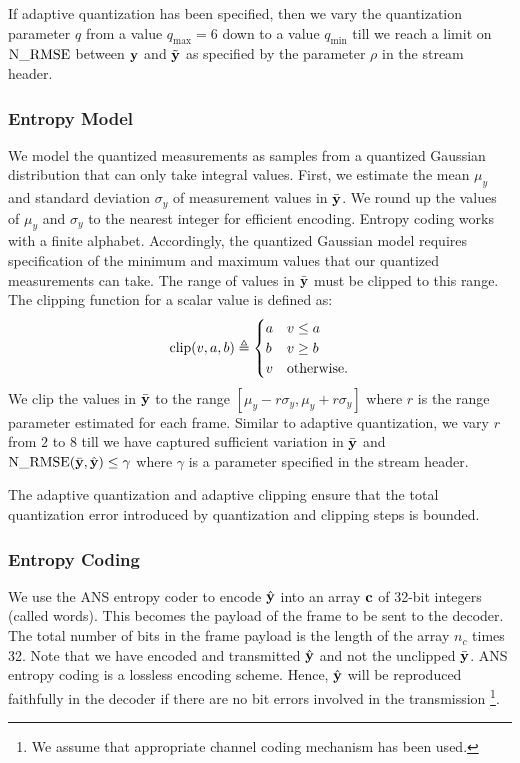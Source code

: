 If adaptive quantization has been specified, then we vary
the quantization parameter $q$ from a value $q_{\max}=6$
down to a value $q_{\min}$
till we reach a limit on $\mathrm{N\_RMSE}$ between $\mathbf{y}$ and $\tilde{\mathbf{y}}$
as specified by the parameter $\rho$ in the stream header.

\subsubsection{Entropy Model}
We model the quantized measurements as samples from
a quantized Gaussian distribution that can only take integral values.
First, we estimate the mean $\mu_y$ and standard deviation $\sigma_y$
of measurement values in $\bar{\mathbf{y}}$.
We round up the values of $\mu_y$ and $\sigma_y$ to the nearest integer
for efficient encoding.
Entropy coding works with a finite alphabet.
Accordingly, the quantized Gaussian model
requires specification of the minimum
and maximum values that our quantized
measurements can take.
The range of values in $\bar{\mathbf{y}}$ must be clipped to this range.
The clipping function for a scalar value is defined as:
\begin{equation}
\mathrm{clip} (v, a, b) \triangleq \begin{cases}
a & v \leq a \\
b & v \geq b \\
v & \text{otherwise}.
\end{cases}
\end{equation}
We clip the values in $\bar{\mathbf{y}}$ to the range
$[\mu_y - r \sigma_y, \mu_y + r \sigma_y]$
where $r$ is the range parameter estimated for each frame.
Similar to adaptive quantization, we vary $r$ from $2$ to $8$
till we have captured sufficient variation in $\bar{\mathbf{y}}$
and $\mathrm{N\_RMSE}(\bar{\mathbf{y}}, \hat{\mathbf{y}}) \leq \gamma$
where $\gamma$ is a parameter specified in the stream header.

The adaptive quantization and adaptive clipping ensure that
the total quantization error introduced by quantization and
clipping steps is bounded.

\subsubsection{Entropy Coding}
We use the ANS entropy coder to encode $\hat{\mathbf{y}}$ into an array
$\mathbf{c}$ of 32-bit integers (called words).
This becomes the payload of the frame to be sent to the decoder.
The total number of bits in the frame payload
is the length of the array $n_c$ times 32.
Note that we have encoded and transmitted $\hat{\mathbf{y}}$
and not the unclipped $\bar{\mathbf{y}}$. ANS entropy coding
is a lossless encoding scheme. Hence, $\hat{\mathbf{y}}$
will be reproduced faithfully in the decoder if there
are no bit errors involved in the transmission
\footnote{We assume that appropriate
channel coding mechanism has been used.}.

